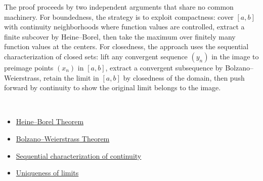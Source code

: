 \begin{remark*}
The proof proceeds by two independent arguments that share no common machinery. For boundedness, the strategy is to exploit compactness: cover $[a,b]$ with continuity neighborhoods where function values are controlled, extract a finite subcover by Heine--Borel, then take the maximum over finitely many function values at the centers. For closedness, the approach uses the sequential characterization of closed sets: lift any convergent sequence $(y_n)$ in the image to preimage points $(x_n)$ in $[a,b]$, extract a convergent subsequence by Bolzano--Weierstrass, retain the limit in $[a,b]$ by closedness of the domain, then push forward by continuity to show the original limit belongs to the image.
\end{remark*}

\begin{remark*}[Dependencies]~\\
\begin{itemize}
  \item \hyperref[thm:heine-borel]{Heine--Borel Theorem}
  \item \hyperref[thm:bolzano-weierstrass]{Bolzano--Weierstrass Theorem}
  \item \hyperref[thm:continuity-three-equiv]{Sequential characterization of continuity}
  \item \hyperref[thm:uniqueness-of-limits]{Uniqueness of limits}
\end{itemize}
\end{remark*}
